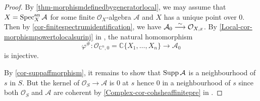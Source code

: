 \begin{proof}
By \cref{thm-morphismdefinedbygeneratorlocal}, we may assume that $X=\operatorname{Spec}^{\mathrm{an}}_X \mathcal{A}$ for some finite $\mathcal{O}_X$-algebra $\mathcal{A}$ and $X$ has a unique point over $0$. Then by \cref{cor-finitespectrumidentification}, we have $\mathcal{A}_0\stackrel{\sim}{\longrightarrow} \mathcal{O}_{X,x}$. By \cref{Local-cor-morphismpowertolocalsurinj} in , the natural homomorphism
\[
    \varphi^{\#}:\mathcal{O}_{\mathbb{C}^n,0}=\mathbb{C}\{X_1,\ldots,X_n\}\rightarrow \mathcal{A}_0
\]
is injective. 

By \cref{cor-suppaffmorphism}, it remains to show that $\operatorname{Supp} \mathcal{A}$ is a neighbourhood of $s$ in $S$. But the kernel of $\mathcal{O}_S\rightarrow \mathcal{A}$ is $0$ at $s$ hence $0$ in a neighbourhood of $s$ since both $\mathcal{O}_S$ and $\mathcal{A}$ are coherent by \cref{Complex-cor-cohsheaffinitepre} in .
\end{proof}


